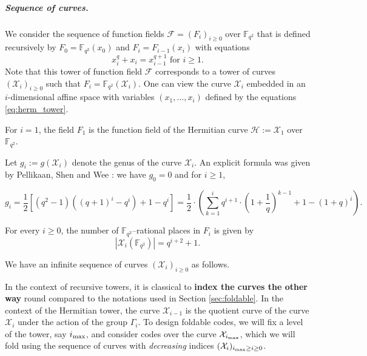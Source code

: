 \documentclass[10pt,a4paper]{article}
\newcommand\F{\mathbb{F}}
\newcommand\PP{\mathbb{P}}
\newcommand{\size}[1]{\left|#1\right|}
\newcommand\calX{\mathcal{X}}
\newcommand\calF{\mathcal{F}}
\newcommand{\cd}{\cdot}
\newcommand{\ii}{i_{\rm{max}}}
\theoremstyle{plain}
\theoremstyle{plain}
\theoremstyle{definition}
\theoremstyle{remark}
\theoremstyle{plain}
\begin{document}
\subparagraph*{Sequence of curves.}
We consider the sequence of function fields $\calF=(F_i)_{i\geq 0}$ over $\F_{q^2}$ that is defined recursively by $F_0=\F_{q^2}(x_0)$ and $F_i = F_{i-1}(x_i)$ with equations
\begin{equation}\label{eq:herm_tower}
	x_i^q+x_{i} = x_{i-1}^{q+1} \text{ for } i\geq 1.
\end{equation}
Note that this tower of function field $\mathcal{F}$ corresponds to a tower of curves
$(\calX_i)_{i\geq 0}$ such that $F_i=\F_{q^2}(\calX_i)$. One can view the curve $\calX_i$ embedded in an $i$-dimensional affine space with variables $(x_1,\dots,x_i)$ defined by the equations \eqref{eq:herm_tower}.

For $i=1$, the field $F_1$ is the function field of the Hermitian curve $\mathcal{H}:= \calX_1$ over $\F_{q^2}$.

Let $g_i:=g(\calX_i)$ denote the genus of the curve $\calX_i$. An explicit formula was given by Pellikaan, Shen and Wee \cite[Proposition 4]{PSW91}: we have $g_0=0$ and for $i\geq 1$, 

\begin{equation}\label{eq:genus_herm}
	g_i = \frac{1}{2}\left[(q^2-1)\left((q+1)^i-q^i\right) +1 -q^i\right]
	=\dfrac{1}{2} \cd \left(\sum\limits_{k=1}^i q^{i+1} \cd \left(1+\frac{1}{q}\right)^{k-1} +1 -(1+q)^i\right).
\end{equation}

For every $i \geq 0$, the number of $\F_{q^2}$--rational places in $F_i$ is given by
\[\size{\calX_i(\F_{q^2})} = q^{i+2}+1.\]

We have an infinite sequence of curves $(\calX_i)_{i\ge 0}$ as follows.

\begin{center}
\end{center} 

\begin{remark}
	In the context of recursive towers, it is classical to \textbf{index the curves the other way} round compared to the notations used in Section \ref{sec:foldable}. In the context of the Hermitian tower, the curve $\calX_{i-1}$ is the quotient curve of the curve $\calX_i$ under the action of the group $\Gamma_i$. To design foldable codes, we will fix a level of the tower, say $\ii$, and consider codes over the curve $\calX_{\ii}$, which we will fold using the sequence of curves with \emph{decreasing} indices $(\calX_i)_{\ii \geq i \geq 0}$.
\end{remark}
\end{document}
